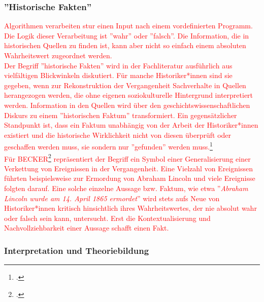 \documentclass[12pt,a4paper]{article}
\begin{document}
\subsubsection{''Historische Fakten''}
\label{HistorischeFakten}
\textcolor{red}
{
Algorithmen verarbeiten stur einen Input nach einem vordefinierten Programm. Die Logik dieser Verarbeitung ist ''wahr'' oder ''falsch''. Die Information, die in historischen Quellen zu finden ist, kann aber nicht so einfach einem absoluten Wahrheitswert zugeordnet werden.  
\\
Der Begriff ''historische Fakten'' wird in der Fachliteratur ausführlich aus vielfältigen Blickwinkeln diskutiert. Für manche Historiker*innen sind sie gegeben, wenn zur Rekonstruktion der Vergangenheit Sachverhalte in Quellen herangezogen werden, die ohne eigenen soziokulturelle Hintergrund interpretiert werden. Information in den Quellen wird über den geschichtswissenschaftlichen Diskurs zu einem ''historischen Faktum'' transformiert. Ein gegensätzlicher Standpunkt ist, dass ein Faktum unabhängig von der Arbeit der Historiker*innen existiert und die historische Wirklichkeit nicht von diesen überprüft oder geschaffen werden muss, sie sondern nur ''gefunden'' werden muss.\footcite{evans1998fakten}
\\
Für BECKER\footcite{becker1955historical} repräsentiert der Begriff ein Symbol einer Generalisierung einer Verkettung von Ereignissen in der Vergangenheit. Eine Vielzahl von Ereignissen führten beispielsweise zur Ermordung von Abraham Lincoln und viele Ereignisse folgten darauf. Eine solche einzelne Aussage bzw. Faktum, wie etwa ''\textit{Abraham Lincoln wurde am 14. April 1865 ermordet}'' wird stets aufs Neue von Historiker*innen kritisch hinsichtlich ihres Wahrheitswertes, der nie absolut wahr oder falsch sein kann, untersucht. Erst die Kontextualisierung und Nachvollziehbarkeit einer Aussage schafft einen Fakt.  
}
\subsubsection{Interpretation und Theoriebildung}
\end{document}
